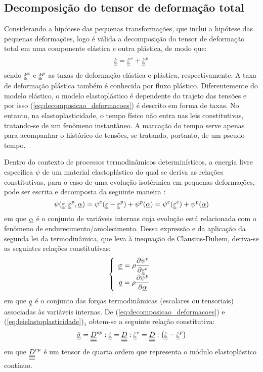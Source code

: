 \subsection{Decomposição do tensor de deformação total}
Considerando a hipótese das pequenas transformações, que inclui a hipótese das pequenas deformações, logo é válida a decomposição do tensor de deformação total em uma componente elástica e outra plástica, de modo que:
\begin{equation}
	\label{eq:decomposicao_deformacoes}
	\dot {\underline{\underline \varepsilon}} = \dot {\underline{\underline \varepsilon}}^e + \dot {\underline{\underline \varepsilon}}^p 
\end{equation}
sendo $\dot {\underline{\underline \varepsilon}}^e$ e $\dot {\underline{\underline \varepsilon}}^p$ as taxas de deformação elástica e plástica, respectivamente. A taxa de deformação plástica também é conhecida por fluxo plástico. Diferentemente do modelo elástico, o modelo elastoplástico é dependente do trajeto das tensões e por isso (\ref{eq:decomposicao_deformacoes}) é descrito em forma de taxas. No entanto, na elastoplasticidade, o tempo físico não entra nas leis constitutivas, tratando-se de um fenômeno instantâneo. A marcação do tempo serve apenas para acompanhar o histórico de tensões, se tratando, portanto, de um pseudo-tempo.

Dentro do contexto de processos termodinâmicos determinísticos, a energia livre específica $\psi$ de um material elastoplástico do qual se deriva as relações constitutivas, para o caso de uma evolução isotérmica em pequenas deformações, pode ser escrita e decomposta da seguinte maneira \cite[p. 149]{Neto2008}:
\begin{equation}
	\label{eq:energia_livre}
	\psi(\underline{\underline \varepsilon},\underline{\underline \varepsilon}^p,\underline \alpha) = \psi^e(\underline{\underline \varepsilon}-\underline{\underline \varepsilon}^p)+ \psi^p(\underline \alpha) = \psi^e(\underline{\underline \varepsilon}^e)+ \psi^p(\underline \alpha) 
\end{equation}
em que $\underline \alpha$ é o conjunto de variáveis internas cuja evolução está relacionada com o fenômeno de endurecimento/amolecimento. Dessa expressão e da aplicação da segunda lei da termodinâmica, que leva à inequação de Clausius-Duhem, deriva-se as seguintes relações constitutivas:
\begin{equation}
	\label{eq:leielastoplasticidade}
		\left\{
		\begin{array}{rcl}
			\underline{\underline \sigma} = \rho \dfrac{\partial \psi^e}{\partial \underline{\underline \varepsilon}^e} \\ 
			\underline q = \rho \dfrac{\partial \psi^p}{\partial \underline \alpha}
			
		\end{array}
		\right.
\end{equation}
em que $\underline q$ é o conjunto das forças termodinâmicas (escalares ou tensoriais) associadas às variáveis internas. De (\ref{eq:decomposicao_deformacoes}) e (\ref{eq:leielastoplasticidade})$_1$ obtem-se a seguinte relação constitutiva:
\begin{equation}
	\label{eq:leielastoplastica}
	\dot {\underline{\underline \sigma}} = \underline{\underline{\underline{\underline D}}}^{ep}:\dot {\underline{\underline \varepsilon}} = \underline{\underline{\underline{\underline D}}}:\dot {\underline{\underline \varepsilon}}^e = \underline{\underline{\underline{\underline D}}}:\left(\dot {\underline{\underline \varepsilon}} - \dot {\underline{\underline \varepsilon}}^p \right)
\end{equation}
em que $\underline{\underline{\underline{\underline D}}}^{ep}$ é um tensor de quarta ordem que representa o módulo elastoplástico contínuo.

